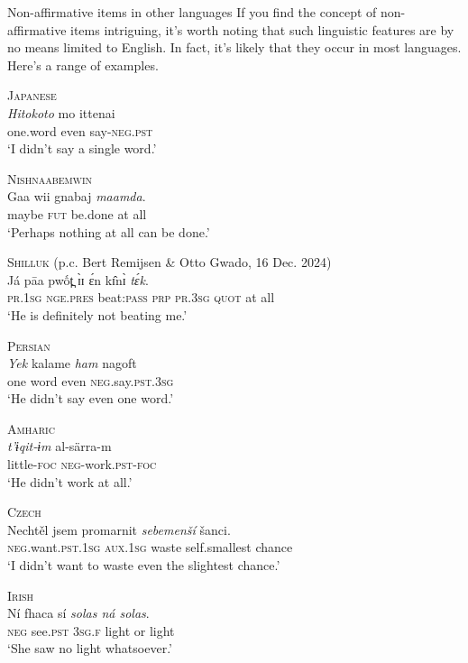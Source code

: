 \ea \label{ex:positive-much}
    \z
\z

\begin{tblsframed}{Non-affirmative items in other languages}
If you find the concept of non-affirmative items intriguing, it's worth noting that such linguistic features are by no means limited to English. In fact, it's likely that they occur in most languages. Here's a range of examples.

\ea \textsc{Japanese}\\
    \gll \emph{Hitokoto} mo ittenai\\
     one.word even say-\textsc{neg.pst} \\
\glt `I didn't say a single word.'
\z

\ea \textsc{Nishnaabemwin} \citep[843]{Valentine2001}\\
    \gll Gaa wii gnabaj \emph{maamda}.\\
     maybe \textsc{fut} be.done {at all}\\
\glt `Perhaps nothing at all can be done.'
\z

\ea \textsc{Shilluk} (p.c. Bert Remijsen \& Otto Gwado, 16 Dec. 2024)\\
    \gll Já pāa pwốt̪ ɪ̀ɪ ɛ́n kɪ̂nɪ̀ \emph{tɛ́k}.\\
     \textsc{pr.1sg} \textsc{nge.pres} beat:\textsc{pass} \textsc{prp} \textsc{pr.3sg} \textsc{quot} {at all}\\
\glt `He is definitely not beating me.'
\z


\ea \textsc{Persian}\\
    \gll \emph{Yek} kalame \emph{ham} nagoft\\
     one word even \textsc{neg}.say.\textsc{pst.3sg}\\
\glt `He didn't say even one word.'
\z

\ea \textsc{Amharic}\\
    \gll \emph{t'ɨqit-ɨm} al-särra-m\\
     little-\textsc{foc} \textsc{neg}-work.\textsc{pst-foc}\\
\glt `He didn't work at all.'
\z

\ea \textsc{Czech}\\
    \gll Nechtěl jsem promarnit \emph{sebemenší} šanci.\\
     \textsc{neg}.want.\textsc{pst.1sg} \textsc{aux.1sg} waste self.smallest chance\\
\glt `I didn't want to waste even the slightest chance.'
\z

\ea \textsc{Irish}\\
    \gll Ní fhaca sí \emph{solas ná solas}.\\
     \textsc{neg} see.\textsc{pst} \textsc{3sg.f} {light or light}\\
\glt `She saw no light whatsoever.'
\z


\end{tblsframed}


